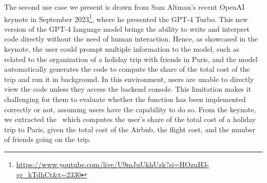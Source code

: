 The second use case we present is drawn from Sam Altman's recent OpenAI keynote in September 2023\footnote{\url{https://www.youtube.com/live/U9mJuUkhUzk?si=HOzuH3-gr_kTdhCt&t=2330}}, where he presented the GPT-4 Turbo.
This new version of the GPT-4 language model brings the ability to write and interpret code directly without the need of human interaction.
Hence, as showcased in the keynote, the user could prompt multiple information to the model, such as related to the organization of a holiday trip with friends in Paris, and the model automatically generates the code to compute the share of the total cost of the trip and run it in background.
In this environment, users are unable to directly view the code unless they access the backend console.
This limitation makes it challenging for them to evaluate whether the function has been implemented correctly or not, assuming users have the capability to do so.
%
From the keynote, we extracted the~ which computes the user's share of the total cost of a holiday trip to Paris, given the total cost of the Airbnb, the flight cost, and the number of friends going on the trip.
%

